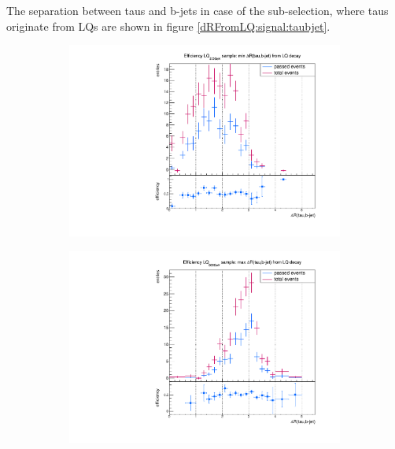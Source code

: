 %
The separation between taus and b-jets in case of the sub-selection, where taus originate from LQs are shown in figure \ref{dRFromLQ:signal:taubjet}.
%
\begin{figure}
  \centering
                \begin{subfigure}[t]{0.49\textwidth}
                \includegraphics[width=\textwidth]{figures/plots/LQ75/Divided_mindR_fromLQ_taubjet.pdf}
                \label{dRFromLQ:signal:taubjet:minLQ75}
                \end{subfigure}
                \begin{subfigure}[t]{0.49\textwidth}
                \includegraphics[width=\textwidth]{figures/plots/LQ75/Divided_maxdR_fromLQ_taubjet.pdf}

\end{subfigure}
\end{figure}
